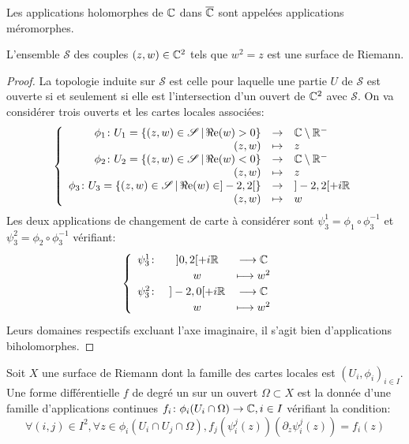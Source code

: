\begin{rem}
Les applications holomorphes de $\mathbb{C}$  dans $\overline{\mathbb{C}}$ sont appelées applications méromorphes.
\end{rem}
\begin{prop}
\label{prop:surface_racine}
L'ensemble $\mathcal{S}$ des couples $(z,w) \in \mathbb{C}^2$ tels que $w^2=z$ est une surface de Riemann.
\end{prop}
\begin{proof}
La topologie induite sur $\mathcal{S}$ est celle pour laquelle une partie $U$ de $\mathcal{S}$ est ouverte si et seulement si elle est l'intersection d'un ouvert de $\mathbb{C}^2$ avec $\mathcal{S}$. On va considérer trois ouverts et les cartes locales associées:
\[
\left \{
\begin{array}{r c l}
\phi_1 \colon  U_1 = \{ (z,w)\in \mathcal{S}\, | \, \Re \text{e}(w) > 0 \}  &\to&  \mathbb{C} \setminus \mathbb R^-\\
 (z, w)  &\mapsto&  z \\
\phi_2 \colon  U_2 = \{ (z,w)\in \mathcal{S}\, | \, \Re \text{e}(w) < 0 \} &\to& \mathbb{C} \setminus \mathbb R^-\\
 (z, w)  &\mapsto&  z \\
\phi_3 \colon U_3 = \{ (z,w)\in \mathcal{S}\, | \, \Re \text{e}(w) \in ]-2,2[ \} &\to& ]-2,2[ + i \mathbb R \\
 (z, w)  &\mapsto&  w \\ 
\end{array}
\right .
\]
Les deux applications de changement de carte à considérer sont $\psi_3^1 = \phi_1 \circ \phi_3^{-1}$ et $\psi_3^2 = \phi_2 \circ \phi_3^{-1}$ vérifiant:
\[
\begin{cases}
\begin{array}{rccl}
\psi_3^1 \colon & ]0,2[ + i \mathbb R & \longrightarrow  \mathbb{C} \\
& w & \longmapsto  w^2 \\
\psi_3^2 \colon & ]-2,0[ + i \mathbb R & \longrightarrow  \mathbb{C} \\
& w & \longmapsto  w^2    
\end{array}

\end{cases}
\]
Leurs domaines respectifs excluant l'axe imaginaire, il s'agit bien d'applications biholomorphes. 
\end{proof}
\begin{defn}
\label{def:forme_degre_un}
Soit $X$ une surface de Riemann dont la famille des cartes locales est $(U_i,\phi_i)_{i \in I}$. Une forme différentielle $f$ de degré un sur un ouvert $\Omega \subset X$ est la donnée d'une famille d'applications continues $f_i \colon \phi_i(U_i \cap \Omega) \to \mathbb{C}, i \in I$ vérifiant la condition:
\[
\forall (i,j)\in I^2, \forall z \in \phi_i\left(U_i\cap U_j \cap \Omega\right), f_j\left(\psi_i^j(z)\right)\left(\partial_z \psi_i^j(z)\right)=f_i(z)
\]
\end{defn}
